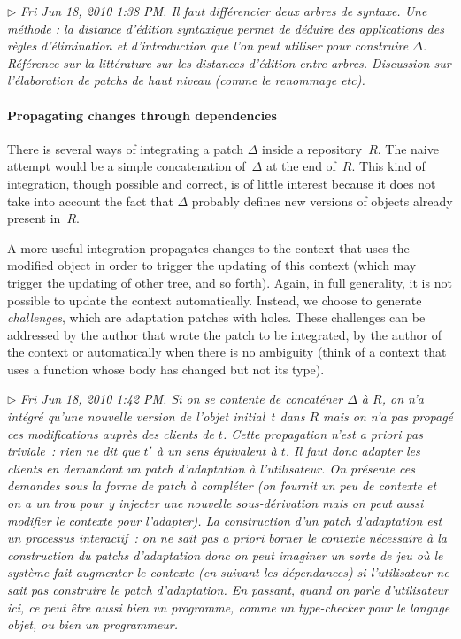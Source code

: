 \documentclass{article}
\newcommand{\remtext}[1]{\textcolor{bwgreen}{$\triangleright$ \textsl{#1}}}
\begin{document}
\remtext{Fri Jun 18, 2010 1:38 PM. Il faut différencier deux arbres de
  syntaxe. Une méthode : la distance d'édition syntaxique permet de
  déduire des applications des règles d'élimination et d'introduction
  que l'on peut utiliser pour construire $\Delta$. Référence sur la
  littérature sur les distances d'édition entre arbres. Discussion sur
  l'élaboration de patchs de haut niveau (comme le renommage etc). }

\paragraph{Propagating changes through dependencies}
\-

There is several ways of integrating a patch $\Delta$ inside a
repository~$R$.  The naive attempt would be a simple concatenation
of~$\Delta$ at the end of~$R$.  This kind of integration, though
possible and correct, is of little interest because it does not take
into account the fact that $\Delta$ probably defines new versions of
objects already present in~$R$.

A more useful integration propagates changes to the context that uses
the modified object in order to trigger the updating of this context
(which may trigger the updating of other tree, and so forth). Again,
in full generality, it is not possible to update the context
automatically. Instead, we choose to generate \textit{challenges},
which are adaptation patches with holes. These challenges can be
addressed by the author that wrote the patch to be integrated, by the
author of the context or automatically when there is no ambiguity
(think of a context that uses a function whose body has changed but
not its type).

\remtext{Fri Jun 18, 2010 1:42 PM. Si on se contente de concaténer
  $\Delta$ à $R$, on n'a intégré qu'une nouvelle version de l'objet
  initial~$t$ dans $R$ mais on n'a pas propagé ces modifications
  auprès des clients de $t$. Cette propagation n'est \textit{a priori}
  pas triviale~: rien ne dit que $t'$ à un sens équivalent à $t$. Il
  faut donc adapter les clients en demandant un patch d'adaptation à
  l'utilisateur. On présente ces demandes sous la forme de patch à
  compléter (on fournit un peu de contexte et on a un trou pour y
  injecter une nouvelle sous-dérivation mais on peut aussi modifier le
  contexte pour l'adapter). La construction d'un patch d'adaptation
  est un processus interactif~: on ne sait pas a priori borner le
  contexte nécessaire à la construction du patchs d'adaptation donc on
  peut imaginer un sorte de jeu où le système fait augmenter le
  contexte (en suivant les dépendances) si l'utilisateur ne sait pas
  construire le patch d'adaptation. En passant, quand on parle
  d'utilisateur ici, ce peut être aussi bien un programme, comme un
  type-checker pour le langage objet, ou bien un programmeur.}
\end{document}
